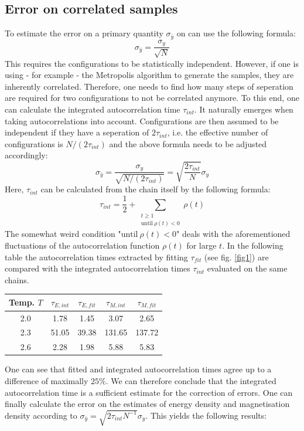 \documentclass[11pt, a4paper]{scrartcl}
\begin{document}
\subsection{Error on correlated samples}
    To estimate the error on a primary quantity $\sigma_{\bar{y}}$ on can use the following formula:
    $$\sigma_{\bar{y}} = \frac{\sigma_y}{\sqrt{N}}$$
    This requires the configurations to be statistically independent. However, if one is using - for example - the Metropolis algorithm to generate the samples, they are inherently correlated. Therefore, one needs to find how many steps of seperation are required for two configurations to not be correlated anymore. To this end, one can calculate the integrated autocorrelation time $\tau_{int}$. It naturally emerges when taking autocorrelations into account. Configurations are then assumed to be independent if they have a seperation of $2 \tau_{int}$, i.e. the effective number of configurations is $N / (2 \tau_{int})$ and the above formula needs to be adjusted accordingly:
    $$\sigma_{\bar{y}} = \frac{\sigma_y}{\sqrt{N / (2 \tau_{int})}} = \sqrt{\frac{2 \tau_{int}}{N}}\sigma_y$$
    Here, $\tau_{int}$ can be calculated from the chain itself by the following formula:
    $$\tau_{int} = \frac{1}{2} + \sum\limits_{\substack{t\ge1 \\ \mathrm{until}\ \rho(t) < 0}} \rho(t)$$
    The somewhat weird condition "$\mathrm{until}\ \rho(t) < 0$" deals with the aforementioned fluctuations of the autocorrelation function $\rho(t)$ for large $t$. In the following table the autocorrelation times extracted by fitting $\tau_{fit}$ (see fig. \ref{fig1}) are compared with the integrated autocorrelation times $\tau_{int}$ evaluated on the same chains.
    \begin{center}
    \begin{tabular}{|c||c|c||c|c|}
        \hline
        Temp. $T$ & $\tau_{E, int}$ & $\tau_{E, fit}$ & $\tau_{M, int}$ & $\tau_{M, fit}$ \\
        \hline
        \hline
        2.0 & 1.78 & 1.45 & 3.07 & 2.65 \\
        \hline
        2.3 & 51.05 & 39.38 & 131.65 & 137.72 \\
        \hline
        2.6 & 2.28 & 1.98 & 5.88 & 5.83 \\
        \hline
    \end{tabular}
    \end{center}
    One can see that fitted and integrated autocorrelation times agree up to a difference of maximally $25\%$. We can therefore conclude that the integrated autocorrelation time is a sufficient estimate for the correction of errors. One can finally calculate the error on the estimates of energy density and magnetisation density according to $\sigma_{\bar{y}} = \sqrt{2\tau_{int}N^{-1}}\sigma_y$. This yields the following results:
\end{document}
